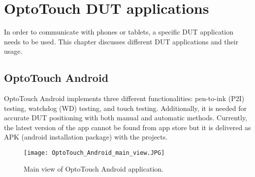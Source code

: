 \chapter{OptoTouch DUT applications}
In order to communicate with phones or tablets, a specific DUT application needs to be used. This chapter discusses different DUT applications and their usage.

\section{OptoTouch Android}
OptoTouch Android implements three different functionalities: pen-to-ink (P2I) testing, watchdog (WD) testing, and touch testing. Additionally, it is needed for accurate DUT positioning with both manual and automatic methods. Currently, the latest version of the app cannot be found from app store but it is delivered as APK (android installation package) with the projects.



\begin{wrapfigure}[20]{r}{0.3\linewidth}
	\centering
	\texttt{[image: OptoTouch\_Android\_main\_view.JPG]}
	\caption{Main view of OptoTouch Android application.}
	\label{fig:optotouch_android_main}
\end{wrapfigure}

